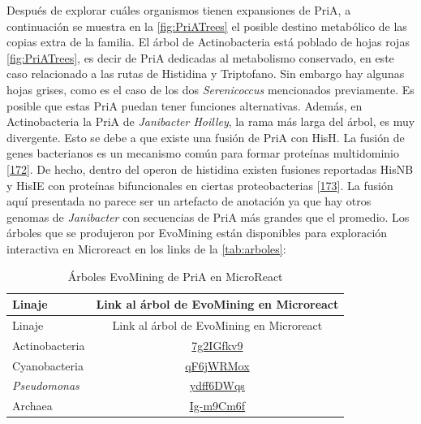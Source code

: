\documentclass[12pt,twoside]{reedthesis}
\begin{document}
  Después de explorar cuáles organismos tienen expansiones de PriA, a
  continuación se muestra en la \autoref{fig:PriATrees} el posible destino
  metabólico de las copias extra de la familia. El árbol de Actinobacteria
  está poblado de hojas rojas \autoref{fig:PriATrees}, es decir de PriA
  dedicadas al metabolismo conservado, en este caso relacionado a las
  rutas de Histidina y Triptofano. Sin embargo hay algunas hojas grises,
  como es el caso de los dos \emph{Serenicoccus} mencionados previamente.
  Es posible que estas PriA puedan tener funciones alternativas. Además,
  en Actinobacteria la PriA de \emph{Janibacter Hoilley}, la rama más
  larga del árbol, es muy divergente. Esto se debe a que existe una fusión
  de PriA con HisH. La fusión de genes bacterianos es un mecanismo común
  para formar proteínas multidominio
  {[}\protect\hyperlink{ref-pasek_gene_2006}{172}{]}. De hecho, dentro del
  operon de histidina existen fusiones reportadas HisNB y HisIE con
  proteínas bifuncionales en ciertas proteobacterias
  {[}\protect\hyperlink{ref-fani_origin_2005}{173}{]}. La fusión aquí
  presentada no parece ser un artefacto de anotación ya que hay otros
  genomas de \emph{Janibacter} con secuencias de PriA más grandes que el
  promedio. Los árboles que se produjeron por EvoMining están disponibles
  para exploración interactiva en Microreact en los links de la
  \autoref{tab:arboles}:
  
  \begin{longtable}[]{@{}lc@{}}
  \caption{Árboles EvoMining de PriA en MicroReact
  \label{tab:arboles}}\tabularnewline
  \toprule
  Linaje & Link al árbol de EvoMining en Microreact\tabularnewline
  \midrule
  \endfirsthead
  \toprule
  Linaje & Link al árbol de EvoMining en Microreact\tabularnewline
  \midrule
  \endhead
  Actinobacteria &
  \href{https://microreact.org/project/7g2IGfkv9}{7g2IGfkv9}\tabularnewline
  Cyanobacteria &
  \href{https://microreact.org/project/qF6jWRMox}{qF6jWRMox}\tabularnewline
  \emph{Pseudomonas} &
  \href{https://microreact.org/project/ydff6DWqs}{ydff6DWqs}\tabularnewline
  Archaea &
  \href{https://microreact.org/project/Ig-m9Cm6f}{Ig-m9Cm6f}\tabularnewline
  \bottomrule
  \end{longtable}
  
\end{document}
